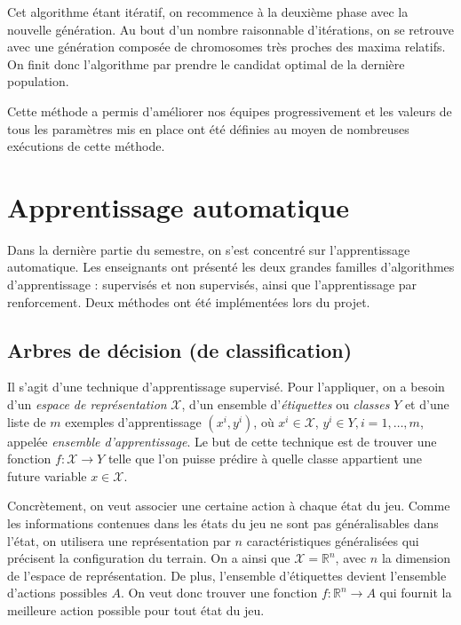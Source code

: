 \documentclass[12pt,a4paper]{article}
\begin{document}
Cet algorithme \'etant it\'eratif, on recommence \`a la deuxi\`eme phase avec 
la nouvelle g\'en\'eration. Au bout d'un nombre raisonnable d'it\'erations, on 
se retrouve avec une g\'en\'eration compos\'ee de chromosomes tr\`es proches 
des maxima relatifs. On finit donc l'algorithme par prendre le candidat optimal 
de la derni\`ere population.

Cette m\'ethode a permis d'am\'eliorer nos \'equipes progressivement et les 
valeurs de tous les param\`etres mis en place ont \'et\'e d\'efinies au moyen 
de nombreuses ex\'ecutions de cette m\'ethode.

\section{Apprentissage automatique}
Dans la derni\`ere partie du semestre, on s'est concentr\'e sur l'apprentissage 
automatique. Les enseignants ont pr\'esent\'e les deux grandes familles 
d'algorithmes d'apprentissage : supervis\'es et non supervis\'es, ainsi que 
l'apprentissage par renforcement. Deux m\'ethodes ont \'et\'e impl\'ement\'ees 
lors du projet.

\subsection*{Arbres de d\'ecision (de classification)}
Il s'agit d'une technique d'apprentissage supervis\'e. Pour l'appliquer, on 
a besoin d'un {\itshape espace de repr\'esentation} $\mathcal{X}$, d'un 
ensemble d'{\itshape \'etiquettes} ou {\itshape classes} $Y$ et d'une liste de 
$m$ exemples d'apprentissage $(x^i,y^i)$, o\`u $x^i \in \mathcal{X}$, $y^i \in 
Y, i = 1,\dotsc,m$, appel\'ee {\itshape ensemble d'apprentissage}.
Le but de cette technique est de trouver une fonction $f: \mathcal{X} \to 
Y$ telle que l'on puisse pr\'edire \`a quelle classe appartient une 
future variable $x \in \mathcal{X}$.

Concr\`etement, on veut associer une certaine action \`a chaque \'etat du jeu. 
Comme les informations contenues dans les \'etats du jeu ne sont pas 
g\'en\'eralisables dans l'\'etat, on utilisera une repr\'esentation par $n$ 
caract\'eristiques g\'en\'eralis\'ees qui pr\'ecisent la configuration du 
terrain. On a ainsi que $\mathcal{X} = \mathbb{R}^n$, avec $n$ la dimension de 
l'espace de repr\'esentation. De plus, l'ensemble d'\'etiquettes devient 
l'ensemble d'actions possibles $A$. On veut donc trouver une fonction $f: 
\mathbb{R}^n \to A$ qui fournit la meilleure action possible pour tout \'etat du 
jeu.
\end{document}
